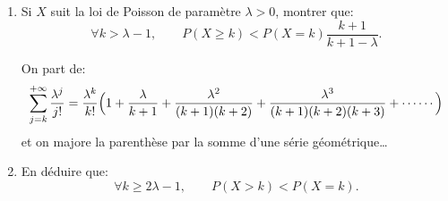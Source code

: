 \documentclass[a4paper,12pt,reqno]{amsart}
\begin{document}

\begin{exo}

  \begin{enumerate}
    \item Si $X$ suit la loi de Poisson de paramètre $\lambda>0$, montrer que:
      $$
        \forall k>\lambda-1,\qquad P(X\geq k)<P(X=k)\frac{k+1}{k+1-\lambda}.
      $$
      \begin{indication}
      On part de:
        $$
          \sum_{j=k}^{+\infty}\frac{\lambda^j}{j!}=
            \frac{\lambda^k}{k!}\Bigl(1+\frac{\lambda}{k+1}+
              \frac{\lambda^2}{(k+1)(k+2)}+\frac{\lambda^3}{(k+1)(k+2)(k+3)}
                + \cdots\cdots\Bigr)
        $$
      et on majore la parenthèse par la somme d'une série géométrique\dots
      \end{indication}
    \item En déduire que:
      $$
        \forall k\geq 2\lambda-1,\qquad P(X>k)<P(X=k).
      $$
  \end{enumerate}

\end{exo}
\end{document}
